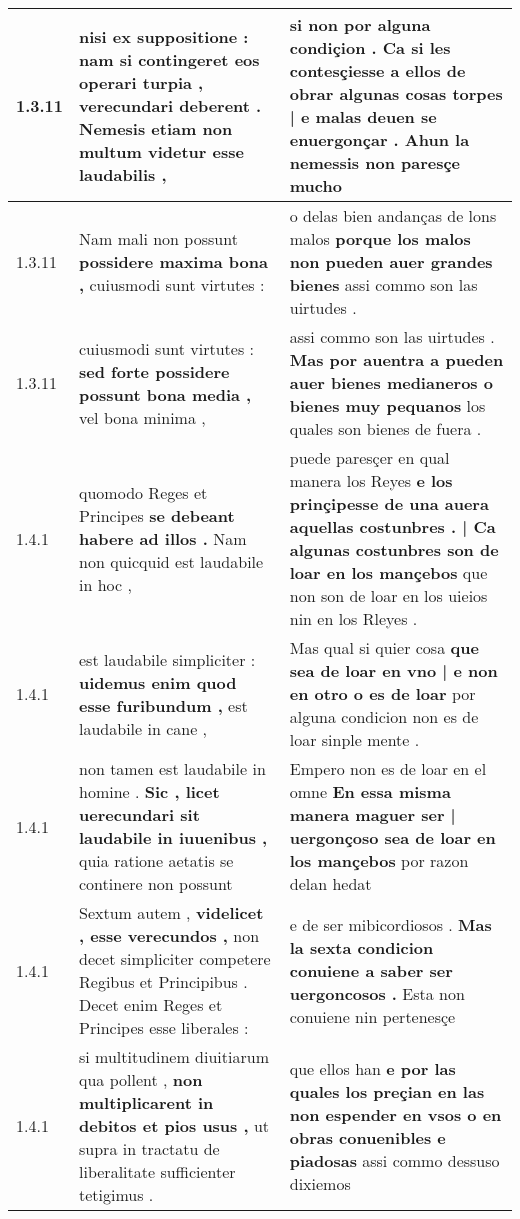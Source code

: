 \begin{tabular}{|p{1cm}|p{6.5cm}|p{6.5cm}|}
1.3.11 & nisi ex suppositione : \textbf{ nam si contingeret eos operari turpia , } verecundari deberent . Nemesis etiam non multum videtur esse laudabilis , & si non por alguna condiçion . \textbf{ Ca si les contesçiesse a ellos de obrar algunas cosas torpes | e malas deuen se enuergonçar . } Ahun la nemessis non paresçe mucho \\\hline
1.3.11 & Nam mali non possunt \textbf{ possidere maxima bona , } cuiusmodi sunt virtutes : & o delas bien andanças de lons malos \textbf{ porque los malos non pueden auer grandes bienes } assi commo son las uirtudes . \\\hline
1.3.11 & cuiusmodi sunt virtutes : \textbf{ sed forte possidere possunt bona media , } vel bona minima , & assi commo son las uirtudes . \textbf{ Mas por auentra a pueden auer bienes medianeros o bienes muy pequanos } los quales son bienes de fuera . \\\hline
1.4.1 & quomodo Reges et Principes \textbf{ se debeant habere ad illos . } Nam non quicquid est laudabile in hoc , & puede paresçer en qual manera los Reyes \textbf{ e los prinçipesse de una auera aquellas costunbres . | Ca algunas costunbres son de loar en los mançebos } que non son de loar en los uieios nin en los Rleyes . \\\hline
1.4.1 & est laudabile simpliciter : \textbf{ uidemus enim quod esse furibundum , } est laudabile in cane , & Mas qual si quier cosa \textbf{ que sea de loar en vno | e non en otro o es de loar } por alguna condicion non es de loar sinple mente . \\\hline
1.4.1 & non tamen est laudabile in homine . \textbf{ Sic , licet uerecundari sit laudabile in iuuenibus , } quia ratione aetatis se continere non possunt & Empero non es de loar en el omne \textbf{ En essa misma manera maguer ser | uergonçoso sea de loar en los mançebos } por razon delan hedat \\\hline
1.4.1 & Sextum autem , \textbf{ videlicet , esse verecundos , } non decet simpliciter competere Regibus et Principibus . Decet enim Reges et Principes esse liberales : & e de ser mibicordiosos . \textbf{ Mas la sexta condicion conuiene a saber ser uergoncosos . } Esta non conuiene nin pertenesçe \\\hline
1.4.1 & si multitudinem diuitiarum qua pollent , \textbf{ non multiplicarent in debitos et pios usus , } ut supra in tractatu de liberalitate sufficienter tetigimus . & que ellos han \textbf{ e por las quales los preçian en las non espender en vsos o en obras conuenibles e piadosas } assi commo dessuso dixiemos \\\hline

\end{tabular}
